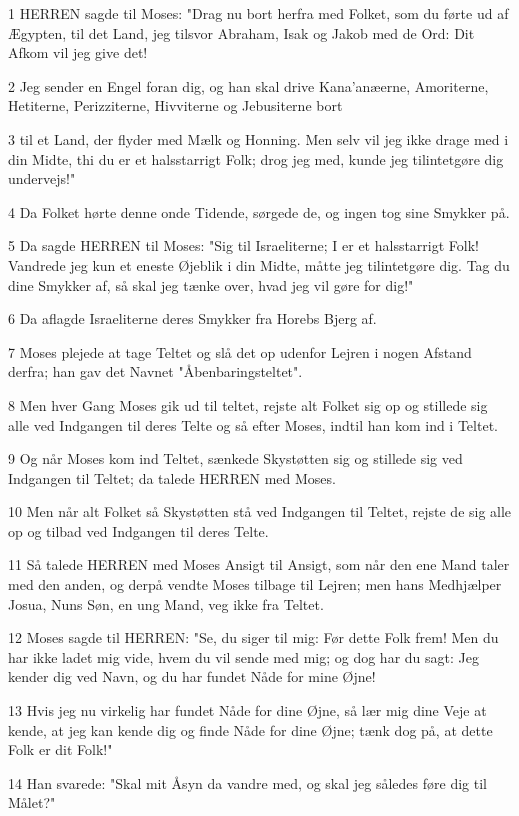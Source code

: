 \par 1 HERREN sagde til Moses: "Drag nu bort herfra med Folket, som du førte ud af Ægypten, til det Land, jeg tilsvor Abraham, Isak og Jakob med de Ord: Dit Afkom vil jeg give det!
\par 2 Jeg sender en Engel foran dig, og han skal drive Kana'anæerne, Amoriterne, Hetiterne, Perizziterne, Hivviterne og Jebusiterne bort
\par 3 til et Land, der flyder med Mælk og Honning. Men selv vil jeg ikke drage med i din Midte, thi du er et halsstarrigt Folk; drog jeg med, kunde jeg tilintetgøre dig undervejs!"
\par 4 Da Folket hørte denne onde Tidende, sørgede de, og ingen tog sine Smykker på.
\par 5 Da sagde HERREN til Moses: "Sig til Israeliterne; I er et halsstarrigt Folk! Vandrede jeg kun et eneste Øjeblik i din Midte, måtte jeg tilintetgøre dig. Tag du dine Smykker af, så skal jeg tænke over, hvad jeg vil gøre for dig!"
\par 6 Da aflagde Israeliterne deres Smykker fra Horebs Bjerg af.
\par 7 Moses plejede at tage Teltet og slå det op udenfor Lejren i nogen Afstand derfra; han gav det Navnet "Åbenbaringsteltet".
\par 8 Men hver Gang Moses gik ud til teltet, rejste alt Folket sig op og stillede sig alle ved Indgangen til deres Telte og så efter Moses, indtil han kom ind i Teltet.
\par 9 Og når Moses kom ind Teltet, sænkede Skystøtten sig og stillede sig ved Indgangen til Teltet; da talede HERREN med Moses.
\par 10 Men når alt Folket så Skystøtten stå ved Indgangen til Teltet, rejste de sig alle op og tilbad ved Indgangen til deres Telte.
\par 11 Så talede HERREN med Moses Ansigt til Ansigt, som når den ene Mand taler med den anden, og derpå vendte Moses tilbage til Lejren; men hans Medhjælper Josua, Nuns Søn, en ung Mand, veg ikke fra Teltet.
\par 12 Moses sagde til HERREN: "Se, du siger til mig: Før dette Folk frem! Men du har ikke ladet mig vide, hvem du vil sende med mig; og dog har du sagt: Jeg kender dig ved Navn, og du har fundet Nåde for mine Øjne!
\par 13 Hvis jeg nu virkelig har fundet Nåde for dine Øjne, så lær mig dine Veje at kende, at jeg kan kende dig og finde Nåde for dine Øjne; tænk dog på, at dette Folk er dit Folk!"
\par 14 Han svarede: "Skal mit Åsyn da vandre med, og skal jeg således føre dig til Målet?"
